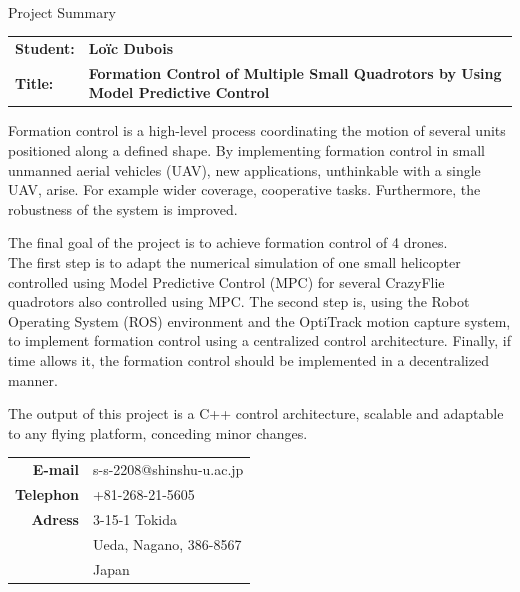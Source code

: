 \documentclass[a4paper, 12pt]{report}
\begin{document}
$\ $

\vspace{3cm}
\Huge{Project Summary}
\vspace{1.5cm}

\begin{table}[h]
\begin{tabular}{p{3cm} p{10cm}}
\textbf{Student:} & \textbf{Loïc Dubois} \\[.5cm]
\textbf{Title:} & \textbf{Formation Control of Multiple Small Quadrotors by Using Model Predictive Control} \\
\end{tabular}
\end{table}
\vspace{1cm}

 
\normalsize 
Formation control is a high-level process coordinating the motion of several units positioned along a defined shape. By implementing formation control in small unmanned aerial vehicles (UAV), new applications, unthinkable with a single UAV, arise. For example wider coverage, cooperative tasks. Furthermore, the robustness of the system is improved.

The final goal of the project is to achieve formation control of 4 drones.\\
The first step is to adapt the numerical simulation of one small helicopter controlled using Model Predictive Control (MPC) for several CrazyFlie quadrotors also controlled using MPC. The second step is, using the Robot Operating System (ROS) environment and the OptiTrack motion capture system, to implement formation control using a centralized control architecture. Finally, if time allows it, the formation control should be implemented in a decentralized manner.

The output of this project is a C++ control architecture, scalable and adaptable to any flying platform, conceding minor changes.

\vspace{.5cm}

\begin{table}[h]
\flushright
\footnotesize
\begin{tabular}{r l}
\textbf{E-mail} &  s-s-2208@shinshu-u.ac.jp\\
\textbf{Telephon} &  +81-268-21-5605\\
\textbf{Adress} &  3-15-1 Tokida\\
&  Ueda, Nagano, 386-8567\\
&  Japan\\
\end{tabular}
\end{table}
\end{document}
